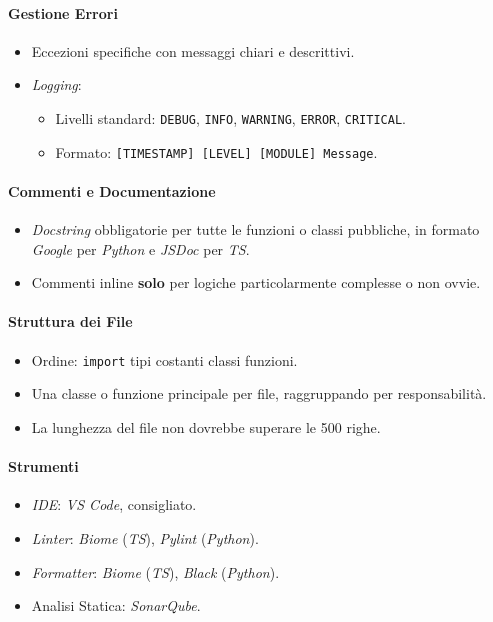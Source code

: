 \documentclass[12pt, a4paper]{article}
\begin{document}
\newpage
\paragraph{Gestione Errori}
\begin{itemize}
    \item Eccezioni specifiche con messaggi chiari e descrittivi.
    \item \textit{Logging}: 
    \begin{itemize}
        \item Livelli standard: \texttt{DEBUG}, \texttt{INFO}, \texttt{WARNING}, \texttt{ERROR}, \texttt{CRITICAL}.
        \item Formato: \texttt{[TIMESTAMP] [LEVEL] [MODULE] Message}.
    \end{itemize}
\end{itemize}

\paragraph{Commenti e Documentazione}
\begin{itemize}
    \item \textit{Docstring} obbligatorie per tutte le funzioni o classi pubbliche, in formato \textit{Google} per \textit{Python} e \textit{JSDoc} per \textit{TS}.
    \item Commenti inline \textbf{solo} per logiche particolarmente complesse o non ovvie.
\end{itemize}

\paragraph{Struttura dei File}
\begin{itemize}
    \item Ordine: \texttt{import} \textrightarrow tipi \textrightarrow costanti \textrightarrow classi \textrightarrow funzioni.
    \item Una classe o funzione principale per file, raggruppando per responsabilità.
    \item La lunghezza del file non dovrebbe superare le 500 righe.
\end{itemize}

\paragraph{Strumenti}
\begin{itemize}
    \item \textit{IDE}: \textit{VS Code}, consigliato.
    \item \textit{Linter}: \textit{Biome} (\textit{TS}), \textit{Pylint} (\textit{Python}).
    \item \textit{Formatter}: \textit{Biome} (\textit{TS}), \textit{Black} (\textit{Python}).
    \item Analisi Statica: \textit{SonarQube}.
\end{itemize}
\end{document}
